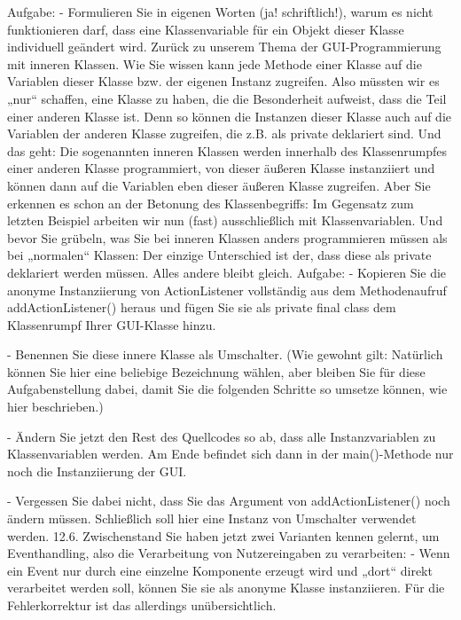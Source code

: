 Aufgabe:
-	Formulieren Sie in eigenen Worten (ja! schriftlich!), warum es nicht funktionieren darf, dass eine Klassenvariable für ein Objekt dieser Klasse individuell geändert wird.
Zurück zu unserem Thema der GUI-Programmierung mit inneren Klassen.
Wie Sie wissen kann jede Methode einer Klasse auf die Variablen dieser Klasse bzw. der eigenen Instanz zugreifen. Also müssten wir es „nur“ schaffen, eine Klasse zu haben, die die Besonderheit aufweist, dass die Teil einer anderen Klasse ist. Denn so können die Instanzen dieser Klasse auch auf die Variablen der anderen Klasse zugreifen, die z.B. als private deklariert sind.
Und das geht: Die sogenannten inneren Klassen werden innerhalb des Klassenrumpfes einer anderen Klasse programmiert, von dieser äußeren Klasse instanziiert und können dann auf die Variablen eben dieser äußeren Klasse zugreifen. Aber Sie erkennen es schon an der Betonung des Klassenbegriffs: Im Gegensatz zum letzten Beispiel arbeiten wir nun (fast) ausschließlich mit Klassenvariablen.
Und bevor Sie grübeln, was Sie bei inneren Klassen anders programmieren müssen als bei „normalen“ Klassen: Der einzige Unterschied ist der, dass diese als private deklariert werden müssen. Alles andere bleibt gleich.
Aufgabe:
-	Kopieren Sie die anonyme Instanziierung von ActionListener vollständig aus dem Methodenaufruf addActionListener() heraus und fügen Sie sie als private final class dem Klassenrumpf Ihrer GUI-Klasse hinzu.

-	Benennen Sie diese innere Klasse als Umschalter. (Wie gewohnt gilt: Natürlich können Sie hier eine beliebige Bezeichnung wählen, aber bleiben Sie für diese Aufgabenstellung dabei, damit Sie die folgenden Schritte so umsetze können, wie hier beschrieben.)

-	Ändern Sie jetzt den Rest des Quellcodes so ab, dass alle Instanzvariablen zu Klassenvariablen werden. Am Ende befindet sich dann in der main()-Methode nur noch die Instanziierung der GUI.

-	Vergessen Sie dabei nicht, dass Sie das Argument von addActionListener() noch ändern müssen. Schließlich soll hier eine Instanz von Umschalter verwendet werden.
12.6.	Zwischenstand
Sie haben jetzt zwei Varianten kennen gelernt, um Eventhandling, also die Verarbeitung von Nutzereingaben zu verarbeiten:
-	Wenn ein Event nur durch eine einzelne Komponente erzeugt wird und „dort“ direkt verarbeitet werden soll, können Sie sie als anonyme Klasse instanziieren. Für die Fehlerkorrektur ist das allerdings unübersichtlich.

